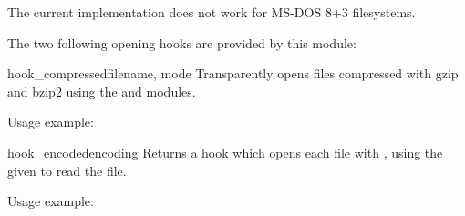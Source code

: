  The current implementation does not work for MS-DOS
8+3 filesystems.


The two following opening hooks are provided by this module:

\begin{funcdesc}{hook_compressed}{filename, mode}
  Transparently opens files compressed with gzip and bzip2 using
  the  and  modules.

  Usage example: 

\end{funcdesc}

\begin{funcdesc}{hook_encoded}{encoding}
  Returns a hook which opens each file with ,
  using the given  to read the file.

  Usage example:

\end{funcdesc}

